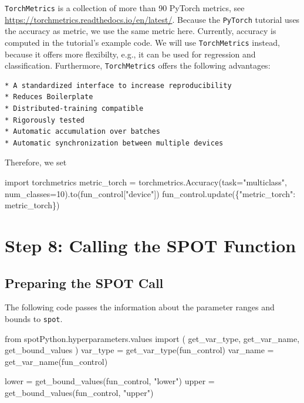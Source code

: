 \documentclass[
  letterpaper,
  DIV=11,
  numbers=noendperiod]{scrreprt}
\newenvironment{Shaded}{\begin{snugshade}}{\end{snugshade}}
\newcommand{\DecValTok}[1]{\textcolor[rgb]{0.68,0.00,0.00}{#1}}
\newcommand{\ImportTok}[1]{\textcolor[rgb]{0.00,0.46,0.62}{#1}}
\newcommand{\NormalTok}[1]{\textcolor[rgb]{0.00,0.23,0.31}{#1}}
\newcommand{\OperatorTok}[1]{\textcolor[rgb]{0.37,0.37,0.37}{#1}}
\newcommand{\StringTok}[1]{\textcolor[rgb]{0.13,0.47,0.30}{#1}}
\begin{document}
\texttt{TorchMetrics} is a collection of more than 90 PyTorch metrics,
see \url{https://torchmetrics.readthedocs.io/en/latest/}. Because the
\texttt{PyTorch} tutorial uses the accuracy as metric, we use the same
metric here. Currently, accuracy is computed in the tutorial's example
code. We will use \texttt{TorchMetrics} instead, because it offers more
flexibilty, e.g., it can be used for regression and classification.
Furthermore, \texttt{TorchMetrics} offers the following advantages:

\begin{verbatim}
* A standardized interface to increase reproducibility
* Reduces Boilerplate
* Distributed-training compatible
* Rigorously tested
* Automatic accumulation over batches
* Automatic synchronization between multiple devices
\end{verbatim}

Therefore, we set

\begin{Shaded}
\begin{Highlighting}[]
\ImportTok{import}\NormalTok{ torchmetrics}
\NormalTok{metric\_torch }\OperatorTok{=}\NormalTok{ torchmetrics.Accuracy(task}\OperatorTok{=}\StringTok{"multiclass"}\NormalTok{, num\_classes}\OperatorTok{=}\DecValTok{10}\NormalTok{).to(fun\_control[}\StringTok{"device"}\NormalTok{])}
\NormalTok{fun\_control.update(\{}\StringTok{"metric\_torch"}\NormalTok{: metric\_torch\})}
\end{Highlighting}
\end{Shaded}

\hypertarget{step-8-calling-the-spot-function-1}{%
\section{Step 8: Calling the SPOT
Function}\label{step-8-calling-the-spot-function-1}}

\hypertarget{sec-prepare-spot-call-14}{%
\subsection{Preparing the SPOT Call}\label{sec-prepare-spot-call-14}}

The following code passes the information about the parameter ranges and
bounds to \texttt{spot}.

\begin{Shaded}
\begin{Highlighting}[]
\ImportTok{from}\NormalTok{ spotPython.hyperparameters.values }\ImportTok{import}\NormalTok{ (}
\NormalTok{    get\_var\_type,}
\NormalTok{    get\_var\_name,}
\NormalTok{    get\_bound\_values}
\NormalTok{    )}
\NormalTok{var\_type }\OperatorTok{=}\NormalTok{ get\_var\_type(fun\_control)}
\NormalTok{var\_name }\OperatorTok{=}\NormalTok{ get\_var\_name(fun\_control)}

\NormalTok{lower }\OperatorTok{=}\NormalTok{ get\_bound\_values(fun\_control, }\StringTok{"lower"}\NormalTok{)}
\NormalTok{upper }\OperatorTok{=}\NormalTok{ get\_bound\_values(fun\_control, }\StringTok{"upper"}\NormalTok{)}
\end{Highlighting}
\end{Shaded}
\end{document}
